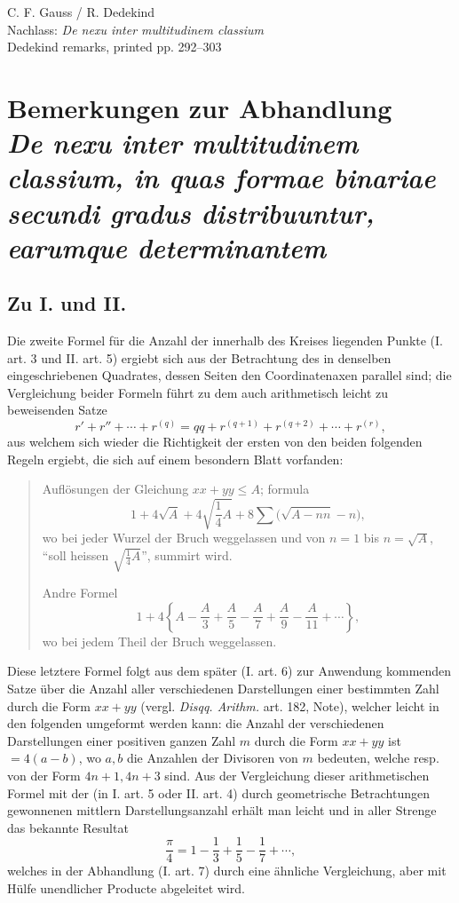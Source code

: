 \documentclass[12pt]{article}
\begin{document}
\begin{center}
{\Large C. F. Gauss / R. Dedekind}\\[3pt]
{\large Nachlass: \emph{De nexu inter multitudinem classium}}\\[3pt]
{\large Dedekind remarks, printed pp. 292--303}
\end{center}

\section*{Bemerkungen zur Abhandlung\\
\emph{De nexu inter multitudinem classium, in quas formae binariae secundi gradus distribuuntur, earumque determinantem}}

\subsection*{Zu I. und II.}

Die zweite Formel für die Anzahl der innerhalb des Kreises liegenden Punkte (I. art. 3 und II. art. 5) ergiebt sich aus der Betrachtung des in denselben eingeschriebenen Quadrates, dessen Seiten den Coordinatenaxen parallel sind; die Vergleichung beider Formeln führt zu dem auch arithmetisch leicht zu beweisenden Satze
\[
r'+r''+\cdots+r^{(q)}=qq+r^{(q+1)}+r^{(q+2)}+\cdots+r^{(r)},
\]
aus welchem sich wieder die Richtigkeit der ersten von den beiden folgenden Regeln ergiebt, die sich auf einem besondern Blatt vorfanden:

\begin{quote}
Auflösungen der Gleichung \(xx+yy\leq A\); formula
\[
1+4\sqrt{A}+4\sqrt{\frac14A}+8\sum\bigl(\sqrt{A-nn}-n\bigr),
\]
wo bei jeder Wurzel der Bruch weggelassen und von \(n=1\) bis \(n=\sqrt A\), ``soll heissen \(\sqrt{\frac14A}\)'', summirt wird.

Andre Formel
\[
1+4\left\{A-\frac A3+\frac A5-\frac A7+\frac A9-\frac A{11}+\cdots\right\},
\]
wo bei jedem Theil der Bruch weggelassen.
\end{quote}

Diese letztere Formel folgt aus dem später (I. art. 6) zur Anwendung kommenden Satze über die Anzahl aller verschiedenen Darstellungen einer bestimmten Zahl durch die Form \(xx+yy\) (vergl. \emph{Disqq. Arithm.} art. 182, Note), welcher leicht in den folgenden umgeformt werden kann: die Anzahl der verschiedenen Darstellungen einer positiven ganzen Zahl \(m\) durch die Form \(xx+yy\) ist \(=4(a-b)\), wo \(a,b\) die Anzahlen der Divisoren von \(m\) bedeuten, welche resp. von der Form \(4n+1,4n+3\) sind. Aus der Vergleichung dieser arithmetischen Formel mit der (in I. art. 5 oder II. art. 4) durch geometrische Betrachtungen gewonnenen mittlern Darstellungsanzahl erhält man leicht und in aller Strenge das bekannte Resultat
\[
\frac{\pi}{4}=1-\frac13+\frac15-\frac17+\cdots,
\]
welches in der Abhandlung (I. art. 7) durch eine ähnliche Vergleichung, aber mit Hülfe unendlicher Producte abgeleitet wird.
\end{document}
